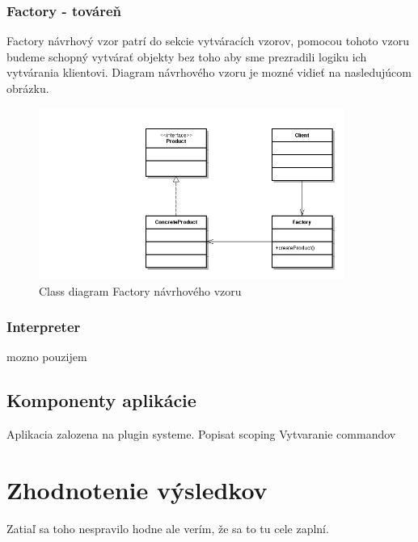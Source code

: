 \subsubsection{Factory - továreň}
\indent Factory návrhový vzor patrí do sekcie vytváracích vzorov, pomocou tohoto vzoru budeme schopný vytvárať objekty bez toho aby sme prezradili logiku ich vytvárania klientovi.
Diagram návrhového vzoru je mozné vidieť na nasledujúcom obrázku.
\begin{figure}[!htbp]
	\centering
	\includegraphics[width=10cm]{img/factory_design_pattern.jpg}
	\caption{Class diagram Factory návrhového vzoru}
	\label{fig:test}
\end{figure}
\newline

\subsubsection{Interpreter}
mozno pouzijem
\subsection{Komponenty aplikácie}
\indent Aplikacia zalozena na plugin systeme.
Popisat scoping
Vytvaranie commandov

\section{Zhodnotenie výsledkov}
Zatiaľ sa toho nespravilo hodne ale verím, že sa to tu cele zaplní.